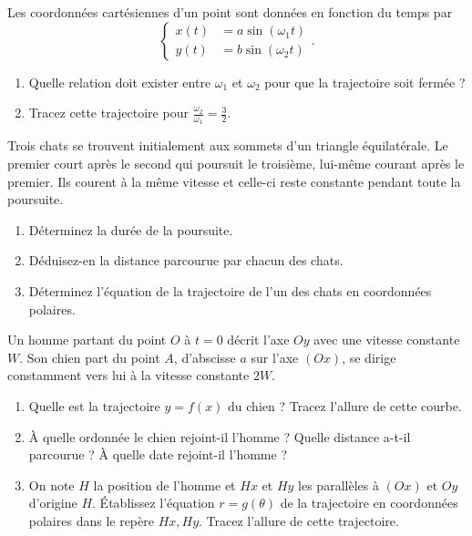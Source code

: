 %
\begin{exercice}
  Les coordonnées cartésiennes d'un point sont données en fonction du temps par
  \begin{equation}
    \begin{cases}
      x(t) &= a\sin(\omega_1 t)\\
      y(t) &= b\sin(\omega_2 t)
    \end{cases}.
  \end{equation}
  \begin{enumerate}
  \item Quelle relation doit exister entre $\omega_1$ et $\omega_2$ pour que la trajectoire soit fermée ?
  \item Tracez cette trajectoire pour $\frac{\omega_2}{\omega_1}=\frac{3}{2}$.
  \end{enumerate}
\end{exercice}
%
\begin{exercice}
  Trois chats se trouvent initialement aux sommets d'un triangle équilatérale. Le premier court après le second qui poursuit le troisième, lui-même courant après le premier. Ils courent à la même vitesse et celle-ci reste constante pendant toute la poursuite.
  \begin{enumerate}
  \item Déterminez la durée de la poursuite.
  \item Déduisez-en la distance parcourue par chacun des chats.
  \item Déterminez l'équation de la trajectoire de l'un des chats en coordonnées polaires.
  \end{enumerate}
\end{exercice}
%
\begin{exercice}
  Un homme partant du point $O$ à $t=0$ décrit l'axe $Oy$ avec une vitesse constante $W$. Son chien part du point $A$, d'abscisse $a$ sur l'axe $(Ox)$, se dirige constamment vers lui à la vitesse constante $2W$.
  \begin{enumerate}
  \item Quelle est la trajectoire $y=f(x)$ du chien ? Tracez l'allure de cette courbe.
  \item À quelle ordonnée le chien rejoint-il l'homme ? Quelle distance a-t-il parcourue ? À quelle date rejoint-il l'homme ?
  \item On note $H$ la position de l'homme et $Hx$ et $Hy$ les parallèles à $(Ox)$ et $Oy$ d'origine $H$. Établissez l'équation $r=g(\theta)$ de la trajectoire en coordonnées polaires dans le repère $Hx,Hy$. Tracez l'allure de cette trajectoire.
  \end{enumerate}
\end{exercice}